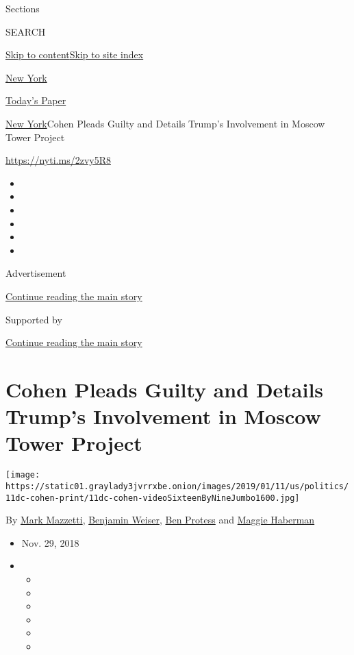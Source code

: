 Sections

SEARCH

\protect\hyperlink{site-content}{Skip to
content}\protect\hyperlink{site-index}{Skip to site index}

\href{https://www.nytimes3xbfgragh.onion/section/nyregion}{New York}

\href{https://myaccount.nytimes3xbfgragh.onion/auth/login?response_type=cookie\&client_id=vi}{}

\href{https://www.nytimes3xbfgragh.onion/section/todayspaper}{Today's
Paper}

\href{/section/nyregion}{New York}\textbar{}Cohen Pleads Guilty and
Details Trump's Involvement in Moscow Tower Project

\url{https://nyti.ms/2zvy5R8}

\begin{itemize}
\item
\item
\item
\item
\item
\item
\end{itemize}

Advertisement

\protect\hyperlink{after-top}{Continue reading the main story}

Supported by

\protect\hyperlink{after-sponsor}{Continue reading the main story}

\hypertarget{cohen-pleads-guilty-and-details-trumps-involvement-in-moscow-tower-project}{%
\section{Cohen Pleads Guilty and Details Trump's Involvement in Moscow
Tower
Project}\label{cohen-pleads-guilty-and-details-trumps-involvement-in-moscow-tower-project}}

\texttt{[image: https://static01.graylady3jvrrxbe.onion/images/2019/01/11/us/politics/11dc-cohen-print/11dc-cohen-videoSixteenByNineJumbo1600.jpg]}

By \href{https://www.nytimes3xbfgragh.onion/by/mark-mazzetti}{Mark
Mazzetti},
\href{https://www.nytimes3xbfgragh.onion/by/benjamin-weiser}{Benjamin
Weiser}, \href{https://www.nytimes3xbfgragh.onion/by/ben-protess}{Ben
Protess} and
\href{https://www.nytimes3xbfgragh.onion/by/maggie-haberman}{Maggie
Haberman}

\begin{itemize}
\item
  Nov. 29, 2018
\item
  \begin{itemize}
  \item
  \item
  \item
  \item
  \item
  \item
  \end{itemize}
\end{itemize}

